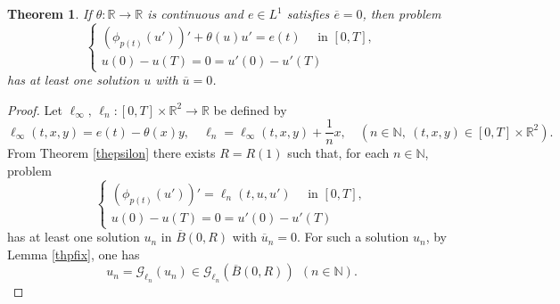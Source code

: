 \documentclass[11pt]{amsart}
\newtheorem{theorem}{Theorem}[section]
\numberwithin{equation}{section} \textwidth=15.5cm
\begin{document}
\begin{theorem}\label{thoper}
If $\theta:\mathbb{R}\to\mathbb{R}$ is continuous and $e\in L^1$ satisfies $\overline{e}=0$, then problem
\begin{equation}\label{pboper}
	\left \{
            \begin{array}{ll}
		      (\phi_{p(t)}(u'))'+\theta(u)u'=e(t)\quad \mbox{ in }[0,T],\\
		      u(0)-u(T)=0=u'(0)-u'(T)
			\end{array}
\right.
\end{equation}
has at least one solution $u$ with $\overline{u}=0$.
\end{theorem}
\begin{proof}
Let $\ell_\infty, \, \ell_n:[0,T]\times\mathbb{R}^2\to\mathbb{R}$ be defined by
$$\ell_\infty(t, x, y)=e(t)-\theta(x)y,\quad \ell_n=\ell_\infty(t, x, y)+\frac{1}{n}x,\quad (n\in\mathbb{N},\ (t,x,y)\in[0,T]\times\mathbb{R}^2).$$
From Theorem \ref{thepsilon} there exists $R=R(1)$ such that, for each $n\in\mathbb{N}$, problem
\begin{equation*}\label{pbelln}
	\left \{
            \begin{array}{ll}
		      (\phi_{p(t)}(u'))'=\ell_n(t,u,u')\quad \mbox{ in }[0,T],\\
		      u(0)-u(T)=0=u'(0)-u'(T)
			\end{array}
\right.
\end{equation*}
has at least one solution $u_n$ in $\overline{B}(0,R)$ with $\overline{u}_n=0$. For such a solution $u_n$, by Lemma \ref{thpfix}, one has
\begin{equation}\label{unG}
    u_n=\mathcal{G}_{\ell_n}(u_n)\in\mathcal{G}_{\ell_n}(\overline{B}(0,R))\ \ (n\in\mathbb{N}).
\end{equation}


\end{proof}
\end{document}
